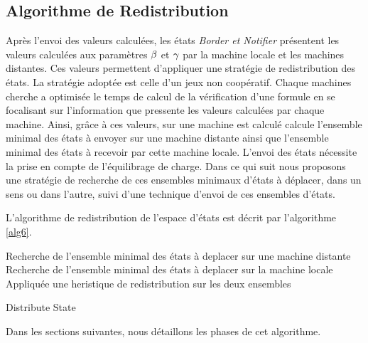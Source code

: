 \subsection{Algorithme de Redistribution }
 
Après l'envoi des valeurs calculées, les états \emph{Border et Notifier} présentent les valeurs calculées aux paramètres $\beta{}$ et $\gamma{}$ par la machine locale et les machines distantes. Ces valeurs permettent d'appliquer une stratégie de redistribution des états. La stratégie adoptée est celle d'un jeux non coopératif. Chaque machines cherche a optimisée le temps de calcul de la vérification d'une formule en se focalisant sur l'information que pressente les valeurs calculées par chaque machine. Ainsi, grâce à ces valeurs, sur une machine est calculé calcule l'ensemble minimal des états à envoyer sur une machine distante ainsi que l'ensemble minimal des états à recevoir par cette machine locale. L'envoi des états nécessite la prise en compte de l'équilibrage de charge.  
Dans ce qui suit nous proposons une stratégie de recherche de ces ensembles minimaux d'états à déplacer, dans un sens ou dans l'autre, suivi d'une technique d'envoi de ces ensembles d'états.

L'algorithme de redistribution de l'espace d'états est décrit par l'algorithme \ref{alg6}.\\
\begin{algorithm}[H]
	\SetAlgoLined
	Recherche de l'ensemble minimal des états à deplacer sur une machine distante\; 
	Recherche de l'ensemble minimal des états à deplacer sur la machine locale\; 
	Appliquée une heristique de redistribution sur les deux ensembles\;
	\caption{Distribute State}\label{alg6}
\end{algorithm}
Dans les sections suivantes, nous détaillons les phases de cet algorithme.

